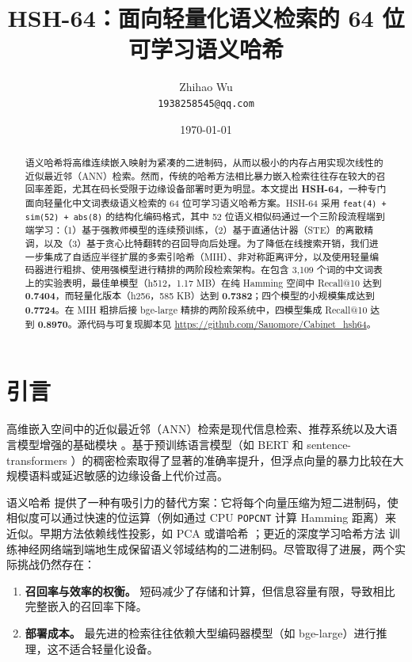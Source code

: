 \documentclass[11pt,a4paper]{article}
\title{
\textbf{HSH-64：面向轻量化语义检索的 64 位可学习语义哈希}
}
\author{
  Zhihao Wu \\
  \texttt{1938258545@qq.com}
}
\date{\today}
\begin{document}
\maketitle

\begin{abstract}
语义哈希将高维连续嵌入映射为紧凑的二进制码，从而以极小的内存占用实现次线性的近似最近邻（ANN）检索。然而，传统的哈希方法相比暴力嵌入检索往往存在较大的召回率差距，尤其在码长受限于边缘设备部署时更为明显。本文提出 \textbf{HSH-64}，一种专门面向轻量化中文词表级语义检索的 64 位可学习语义哈希方案。HSH-64 采用 \texttt{feat(4) + sim(52) + abs(8)} 的结构化编码格式，其中 52 位语义相似码通过一个三阶段流程端到端学习：（1）基于强教师模型的连续预训练，（2）基于直通估计器（STE）的离散精调，以及（3）基于贪心比特翻转的召回导向后处理。为了降低在线搜索开销，我们进一步集成了自适应半径扩展的多索引哈希（MIH）、非对称距离评分，以及使用轻量编码器进行粗排、使用强模型进行精排的两阶段检索架构。在包含 3,109 个词的中文词表上的实验表明，最佳单模型（h512，1.17 MB）在纯 Hamming 空间中 Recall@10 达到 \textbf{0.7404}，而轻量化版本（h256，585 KB）达到 \textbf{0.7382}；四个模型的小规模集成达到 \textbf{0.7724}。在 MIH 粗排后接 bge-large 精排的两阶段系统中，四模型集成 Recall@10 达到 \textbf{0.8970}。源代码与可复现脚本见 \url{https://github.com/Sauomore/Cabinet_hsh64}。
\end{abstract}

\section{引言}

高维嵌入空间中的近似最近邻（ANN）检索是现代信息检索、推荐系统以及大语言模型增强的基础模块 \citep{jegou2011product,guo2020deep}。基于预训练语言模型（如 BERT \citep{devlin2019bert} 和 sentence-transformers \citep{reimers2019sentence}）的稠密检索取得了显著的准确率提升，但浮点向量的暴力比较在大规模语料或延迟敏感的边缘设备上代价过高。

语义哈希 \citep{salakhutdinov2009semantic} 提供了一种有吸引力的替代方案：它将每个向量压缩为短二进制码，使相似度可以通过快速的位运算（例如通过 CPU \texttt{POPCNT} 计算 Hamming 距离）来近似。早期方法依赖线性投影，如 PCA 或谱哈希 \citep{weiss2009spectral}；更近的深度学习哈希方法 \citep{xia2014supervised,cao2015deep,li2016feature} 训练神经网络端到端地生成保留语义邻域结构的二进制码。尽管取得了进展，两个实际挑战仍然存在：
\begin{enumerate}[leftmargin=*]
    \item \textbf{召回率与效率的权衡。} 短码减少了存储和计算，但信息容量有限，导致相比完整嵌入的召回率下降。
    \item \textbf{部署成本。} 最先进的检索往往依赖大型编码器模型（如 bge-large）进行推理，这不适合轻量化设备。
\end{enumerate}
\end{document}
